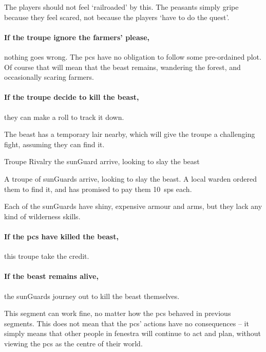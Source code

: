 \begin{multicols}{2}
The players should not feel `railroaded' by this.
The peasants simply gripe because they feel scared, not because the players `have to do the quest'.

\paragraph{If the troupe ignore the farmers' please,}
nothing goes wrong.
The \glspl{pc} have no obligation to follow some pre-ordained plot.
Of course that will mean that the beast remains, wandering the forest, and occasionally scaring farmers.

\paragraph{If the troupe decide to kill the beast,}
they can make a roll to track it down.

The beast has a temporary lair nearby, which will give the troupe a challenging fight, assuming they can find it.

{Troupe Rivalry}%
{the \gls{sunGuard} arrive, looking to slay the beast}%

\begin{exampletext}
  A troupe of \glspl{sunGuard} arrive, looking to slay the beast.
  A local \gls{warden} ordered them to find it, and has promised to pay them 10~\glspl{sp} each.

\end{exampletext}

Each of the \glspl{sunGuard} have shiny, expensive armour and arms, but they lack any kind of wilderness skills.

\paragraph{If the \glspl{pc} have killed the beast,}
this troupe take the credit.

\paragraph{If the beast remains alive,}
the \glspl{sunGuard} journey out to kill the beast themselves.

This \gls{segment} can work fine, no matter how the \glspl{pc} behaved in previous \glspl{segment}.
This does not mean that the \glspl{pc}' actions have no consequences -- it simply means that other people in \gls{fenestra} will continue to act and plan, without viewing the \glspl{pc} as the centre of their world.


\end{multicols}

